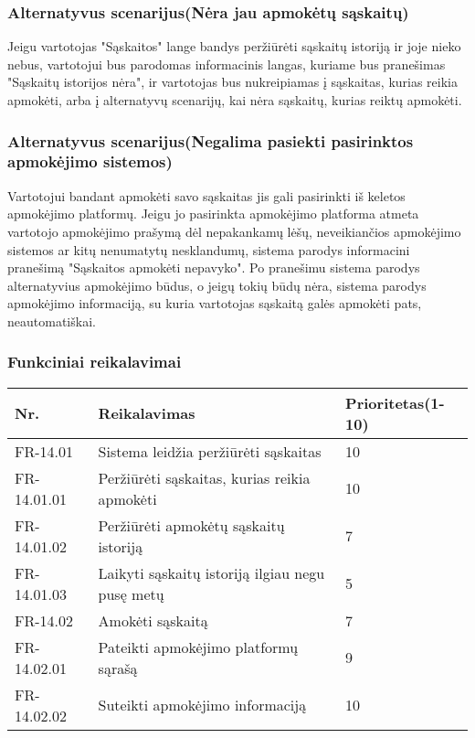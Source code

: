 \documentclass[oneside]{VUMIFPSkursinis}
\begin{document}
	\subsubsection{Alternatyvus scenarijus(Nėra jau apmokėtų sąskaitų)}
	Jeigu vartotojas "Sąskaitos" lange bandys peržiūrėti sąskaitų istoriją ir joje nieko nebus, vartotojui bus parodomas informacinis langas, kuriame bus pranešimas "Sąskaitų istorijos nėra", ir vartotojas bus nukreipiamas į sąskaitas, kurias reikia apmokėti, arba į alternatyvų scenarijų, kai nėra sąskaitų, kurias reiktų apmokėti.
	\subsubsection{Alternatyvus scenarijus(Negalima pasiekti pasirinktos apmokėjimo sistemos)}
	Vartotojui bandant apmokėti savo sąskaitas jis gali pasirinkti iš keletos apmokėjimo platformų. Jeigu jo pasirinkta apmokėjimo platforma atmeta vartotojo apmokėjimo prašymą dėl nepakankamų lėšų, neveikiančios apmokėjimo sistemos ar kitų nenumatytų nesklandumų, sistema parodys informacini pranešimą "Sąskaitos apmokėti nepavyko". Po pranešimu sistema parodys alternatyvius apmokėjimo būdus, o jeigų tokių būdų nėra, sistema parodys apmokėjimo informaciją, su kuria vartotojas sąskaitą galės apmokėti pats, neautomatiškai.
	\subsubsection{Funkciniai reikalavimai}
\begin{table}[htbp]
	\begin{tabularx}{1\textwidth}{ |P{2.5cm}|X|P{3cm }| }  \hline
		Nr. & Reikalavimas & Prioritetas(1-10) \\ \hline
		FR-14.01 & Sistema leidžia peržiūrėti sąskaitas & 10 \\ \hline
		FR-14.01.01& Peržiūrėti sąskaitas, kurias reikia apmokėti & 10 \\ \hline
		FR-14.01.02 & Peržiūrėti apmokėtų sąskaitų istoriją & 7 \\ \hline 
		FR-14.01.03 & Laikyti sąskaitų istoriją ilgiau negu pusę metų & 5 \\ \hline
		FR-14.02 & Amokėti sąskaitą & 7 \\ \hline
		FR-14.02.01 & Pateikti apmokėjimo platformų sąrašą & 9 \\ \hline
		FR-14.02.02 & Suteikti apmokėjimo informaciją & 10 \\ \hline
	\end{tabularx}
\end{table}
\end{document}
